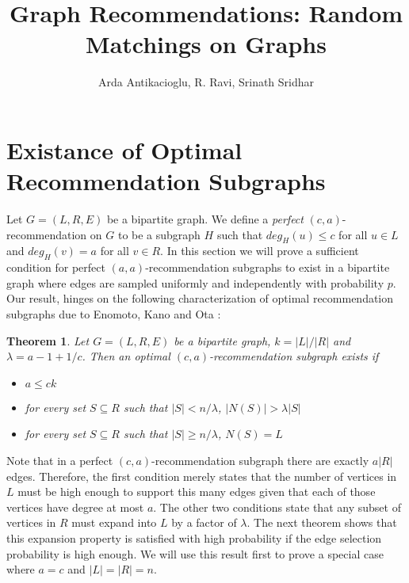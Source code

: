 \documentclass[11pt]{article}
\newtheorem{thm}{Theorem}
\newcommand{\vs}{\vspace{0.2cm}}
\begin{document}
\title{Graph Recommendations: Random Matchings on Graphs}
\author{Arda Antikacioglu, R. Ravi, Srinath Sridhar}
\maketitle







%

\section{Existance of Optimal Recommendation Subgraphs}
Let $G=(L,R,E)$ be a bipartite graph. We define a \emph{perfect} $(c,a)$-recommendation on $G$ to be a subgraph $H$ such that $deg_H(u)\leq c$ for all $u\in L$ and $deg_H(v)=a$ for all $v\in R$. In this section we will prove a sufficient condition for perfect $(a,a)$-recommendation subgraphs to exist in a bipartite graph where edges are sampled uniformly and independently with probability $p$. Our result, hinges on the following characterization of optimal recommendation subgraphs due to Enomoto, Kano and Ota \cite{EnomotoKanoOta1988}:

\begin{thm}
Let $G=(L,R,E)$ be a bipartite graph, $k=|L|/|R|$ and $\lambda = a - 1 + 1/c$. Then an optimal $(c,a)$-recommendation subgraph exists if 

\begin{itemize}
\item $a \leq ck$
\item for every set $S\subseteq R$ such that $|S| < n/\lambda$, $|N(S)| > \lambda|S|$
\item for every set $S\subseteq R$ such that $|S| \geq n/\lambda$, $N(S) = L$
\end{itemize}
\end{thm}
 
Note that in a perfect $(c,a)$-recommendation subgraph there are exactly $a|R|$ edges. Therefore, the first condition merely states that the number of vertices in $L$ must be high enough to support this many edges given that each of those vertices have degree at most $a$. The other two conditions state that any subset of vertices in $R$ must expand into $L$ by a factor of $\lambda$. The next theorem shows that this expansion property is satisfied with high probability if the edge selection probability is high enough. We will use this result first to prove a special case where $a=c$ and $|L|=|R|=n$. \vs
\end{document}
